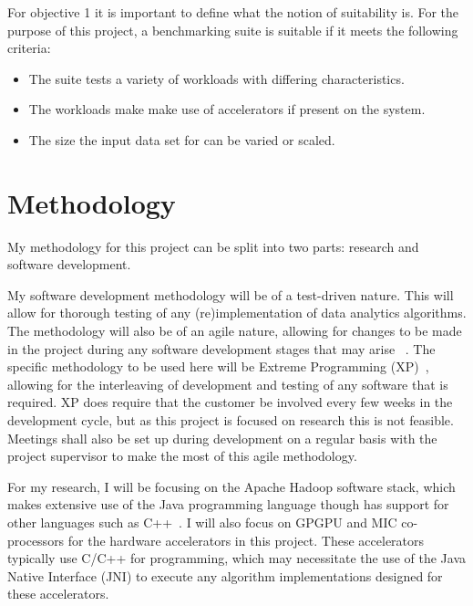 \documentclass[12pt,a4paper]{article}
\begin{document}
		For objective 1 it is important to define what the notion of suitability is. For the purpose of this project, a benchmarking suite is suitable if it meets the following criteria:

		\begin{itemize}
			\item The suite tests a variety of workloads with differing characteristics.
			\item The workloads make make use of accelerators if present on the system.
			\item The size the input data set for can be varied or scaled.
		\end{itemize}


	\section{Methodology} %
	\label{sec:methodology}

	My methodology for this project can be split into two parts: research and software development.

	My software development methodology will be of a test-driven nature. This will allow for thorough testing of any (re)implementation of data analytics algorithms. The methodology will also be of an agile nature, allowing for changes to be made in the project during any software development stages that may arise~ \cite{sommverville-sweng}. The specific methodology to be used here will be Extreme Programming (XP)~\cite{sommverville-sweng}, allowing for the interleaving of development and testing of any software that is required. XP does require that the customer be involved every few weeks in the development cycle, but as this project is focused on research this is not feasible. Meetings shall also be set up during development on a regular basis with the project supervisor to make the most of this agile methodology.

	For my research, I will be focusing on the Apache Hadoop software stack, which makes extensive use of the Java programming language though has support for other languages such as C++~\cite{mapreduce-tut-apache-hadoop}. I will also focus on GPGPU and MIC co-processors for the hardware accelerators in this project. These accelerators typically use C/C++ for programming, which may necessitate the use of the Java Native Interface (JNI) to execute any algorithm implementations designed for these accelerators.
\end{document}
